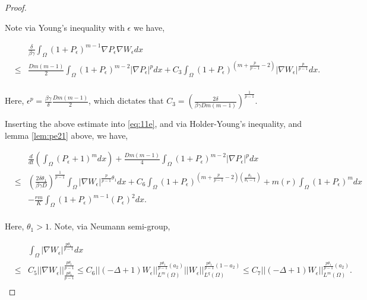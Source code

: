 \documentclass[10pt,a4paper]{amsart}
\begin{document}
\begin{proof}
\begin{lemma}
        \end{lemma}
Note via Young's inequality with $\epsilon$ we have,

\begin{eqnarray}
   && \frac{\delta}{\beta \gamma}\int_{\Omega} (1+P_{\epsilon})^{m-1} \nabla P_{\epsilon} \nabla W_{\epsilon}dx  \nonumber \\ 
&\leq& \frac{Dm(m-1)}{2}\int_{\Omega} (1+P_{\epsilon})^{m-2}|\nabla P_{\epsilon}|^{p} dx + C_{3}\int_{\Omega} (1+P_{\epsilon})^{\left(m+\frac{p}{p-1}-2\right)}|\nabla W_{\epsilon}|^{\frac{p}{p-1}} dx. \nonumber \\
        \end{eqnarray}

Here, $\epsilon^{p}=\frac{\beta \gamma}{\delta}\frac{Dm(m-1)}{2}$, which dictates that $C_{3}=\left(\frac{2 \delta}{\beta \gamma Dm(m-1)}\right)^{\frac{1}{p-1}}$.



Inserting the above estimate into \eqref{eq:11e}, and via Holder-Young's inequality, and lemma \ref{lem:pe21} above, we have,


\begin{eqnarray}
   && \frac{d}{dt}\left(\int_{\Omega} (P_{\epsilon} +1)^{m}dx\right)+\frac{Dm(m-1)}{4} \int_{\Omega} (1+P_{\epsilon})^{m-2}|\nabla P_{\epsilon}|^{p} dx  \nonumber \\ 
&\leq&  \left(\frac{2 \delta\theta_{1}}{\beta \gamma D}\right)^{\frac{1}{p-1}}\int_{\Omega} |\nabla W_{\epsilon}|^{\frac{p}{p-1}\theta_{1}} dx + C_{6}\int_{\Omega} (1+P_{\epsilon})^{\left(m+\frac{p}{p-1}-2\right)\left(\frac{\theta_{1}}{\theta_{1}-1}\right)} + m(r)\int_{\Omega} (1+P_{\epsilon})^{m}dx \nonumber \\
&& -\frac{rm}{K}\int_{\Omega} (1+P_{\epsilon})^{m-1}(P_{\epsilon})^{2} dx.  \nonumber \\
        \end{eqnarray}

Here, $\theta_{1}>1$. Note, via Neumann semi-group,




\begin{eqnarray}
\label{eq:wwp}
   && \int_{\Omega} |\nabla W_{\epsilon}|^{\frac{p\theta_{1}}{p-1}} dx  \nonumber \\ 
&\leq&  C_{5}||\nabla W_{\epsilon}||^{\frac{p\theta_{1}}{p-1}}_{\frac{p\theta_{1}}{p-1}} \leq C_{6}||(-\Delta + 1)W_{\epsilon}||^{\frac{p\theta_{1}}{p-1}(a_{2})}_{L^{m}(\Omega)}||W_{\epsilon}||^{\frac{p\theta_{1}}{p-1}(1-a_{2})}_{L^{q}(\Omega)} \leq C_{7}||(-\Delta + 1)W_{\epsilon}||^{\frac{p\theta_{1}}{p-1}(a_{2})}_{L^{m}(\Omega)}.\nonumber \\
 \end{eqnarray}


\end{proof}
\end{document}
